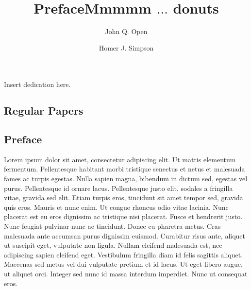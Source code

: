 \documentclass[a4paper,UKenglish]{oasicsmaster-v2021}
\begin{document}

\begin{dedication}
Insert dedication here.
\end{dedication}


\begin{contentslist}



\contitem
\title{Preface}
\author{John Q. Open}

\part{Regular Papers}

\contitem
\title{Mmmmm $\ldots$ donuts}
\author{Homer J. Simpson}


\end{contentslist}


\chapter{Preface}

Lorem ipsum dolor sit amet, consectetur adipiscing elit. Ut mattis
elementum fermentum. Pellentesque habitant morbi tristique senectus et
netus et malesuada fames ac turpis egestas. Nulla sapien magna,
bibendum in dictum sed, egestas vel purus. Pellentesque id ornare
lacus. Pellentesque justo elit, sodales a fringilla vitae, gravida sed
elit. Etiam turpis eros, tincidunt sit amet tempor sed, gravida quis
eros. Mauris et nunc enim. Ut congue rhoncus odio vitae lacinia. Nunc
placerat est eu eros dignissim ac tristique nisi placerat. Fusce et
hendrerit justo. Nunc feugiat pulvinar nunc ac tincidunt. Donec eu
pharetra metus. Cras malesuada ante accumsan purus dignissim
euismod. Curabitur risus ante, aliquet ut suscipit eget, vulputate non
ligula. Nullam eleifend malesuada est, nec adipiscing sapien eleifend
eget. Vestibulum fringilla diam id felis sagittis aliquet. Maecenas
sed metus vel dui vulputate pretium et id lacus. Ut eget libero augue,
ut aliquet orci. Integer sed nunc id massa interdum imperdiet. Nunc ut
consequat eros.
\end{document}
